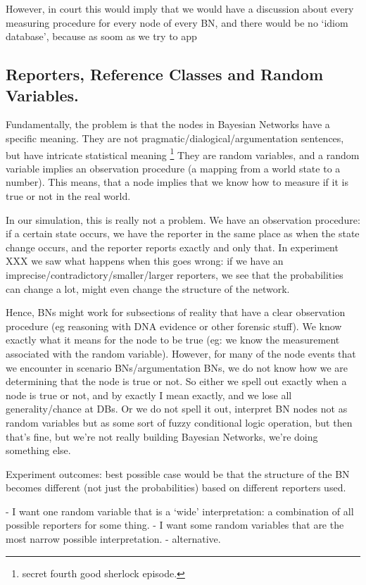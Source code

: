 However, in court this would imply that we would have a discussion about every measuring procedure for every node of every BN, and there would be no `idiom database', because as soom as we try to app
\subsection{Reporters, Reference Classes and Random Variables.}

Fundamentally, the problem is that the nodes in Bayesian Networks have a specific meaning. They are not pragmatic/dialogical/argumentation sentences, but have intricate statistical meaning \footnote{secret fourth good sherlock episode.} They are random variables, and a random variable implies an observation procedure (a mapping from a world state to a number). This means, that a node implies that we know how to measure if it is true or not in the real world.

 In our simulation, this is really not a problem. We have an observation procedure: if a certain state occurs, we have the reporter in the same place as when the state change occurs, and the reporter reports exactly and only that. In experiment XXX we saw what happens when this goes wrong: if we have an imprecise/contradictory/smaller/larger reporters, we see that the probabilities can change a lot, might even change the structure of the network. 
 
Hence, BNs might work for subsections of reality that have a clear observation procedure (eg reasoning with DNA evidence or other forensic stuff). We know exactly what it means for the node to be true (eg: we know the measurement associated with the random variable). However, for many of the node events that we encounter in scenario BNs/argumentation BNs, we do not know how we are determining that the node is true or not. So either we spell out exactly when a node is true or not, and by exactly I mean exactly, and we lose all generality/chance at DBs. Or we do not spell it out, interpret BN nodes not as random variables but as some sort of fuzzy conditional logic operation, but then that's fine, but we're not really building Bayesian Networks, we're doing something else.

Experiment outcomes: best possible case would be that the structure of the BN becomes different (not just the probabilities) based on different reporters used.

- I want one random variable that is a `wide' interpretation: a combination of all possible reporters for some thing.
- I want some random variables that are the most narrow possible interpretation.
- alternative.

